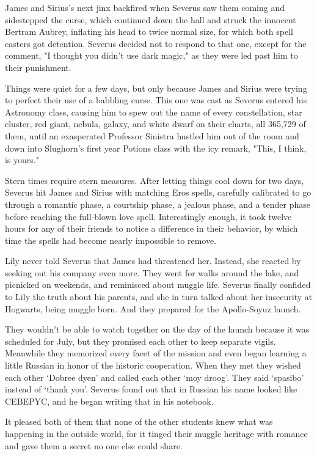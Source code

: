 James and Sirius's next jinx backfired when Severus saw them coming and sidestepped the curse, which continued down the hall and struck the innocent Bertram Aubrey, inflating his head to twice normal size, for which both spell casters got detention. Severus decided not to respond to that one, except for the comment, "I thought you didn't use dark magic," as they were led past him to their punishment.

Things were quiet for a few days, but only because James and Sirius were trying to perfect their use of a babbling curse. This one was cast as Severus entered his Astronomy class, causing him to spew out the name of every constellation, star cluster, red giant, nebula, galaxy, and white dwarf on their charts, all 365,729 of them, until an exasperated Professor Sinistra hustled him out of the room and down into Slughorn's first year Potions class with the icy remark, "This, I think, is yours."

Stern times require stern measures. After letting things cool down for two days, Severus hit James and Sirius with matching Eros spells, carefully calibrated to go through a romantic phase, a courtship phase, a jealous phase, and a tender phase before reaching the full-blown love spell. Interestingly enough, it took twelve hours for any of their friends to notice a difference in their behavior, by which time the spells had become nearly impossible to remove.

Lily never told Severus that James had threatened her. Instead, she reacted by seeking out his company even more. They went for walks around the lake, and picnicked on weekends, and reminisced about muggle life. Severus finally confided to Lily the truth about his parents, and she in turn talked about her insecurity at Hogwarts, being muggle born. And they prepared for the Apollo-Soyuz launch.

They wouldn't be able to watch together on the day of the launch because it was scheduled for July, but they promised each other to keep separate vigils. Meanwhile they memorized every facet of the mission and even began learning a little Russian in honor of the historic cooperation. When they met they wished each other `Dobree dyen' and called each other `moy droog'. They said `spasibo' instead of `thank you'. Severus found out that in Russian his name looked like CEBEPYC, and he began writing that in his notebook.

It pleased both of them that none of the other students knew what was happening in the outside world, for it tinged their muggle heritage with romance and gave them a secret no one else could share.

